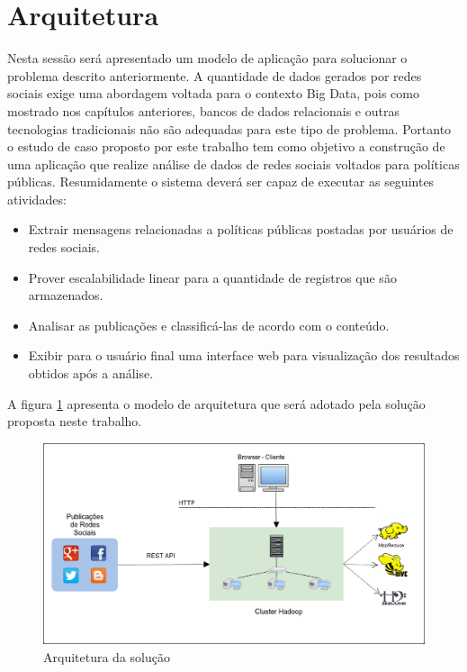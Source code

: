 \section{Arquitetura}

Nesta sessão será apresentado um modelo de aplicação para solucionar o problema descrito anteriormente. A quantidade de dados gerados por redes sociais exige uma abordagem voltada para o contexto Big Data, pois como mostrado nos capítulos anteriores, bancos de dados relacionais e outras tecnologias tradicionais não são adequadas para este tipo de problema. Portanto o estudo de caso proposto por este trabalho tem como objetivo a construção de uma aplicação que realize análise de dados de redes sociais voltados para políticas públicas. Resumidamente o sistema deverá ser capaz de executar as seguintes atividades:

\begin{itemize}
  \item Extrair mensagens relacionadas a políticas públicas postadas por usuários de redes sociais.
  \item Prover escalabilidade linear para a quantidade de registros que são armazenados.
  \item Analisar as publicações e classificá-las de acordo com o conteúdo.
  \item Exibir para o usuário final uma interface web para visualização dos resultados obtidos após a análise.
\end{itemize}

A figura \ref{fig-proposta} apresenta o modelo de arquitetura que será adotado pela solução proposta neste trabalho. 

\begin{figure}[ht!]
	\centering
	\includegraphics[keepaspectratio=true,scale=0.35]
	  {figuras/proposta.eps}
	\caption{Arquitetura da solução}
	\label{fig-proposta}
\end{figure}
\FloatBarrier

